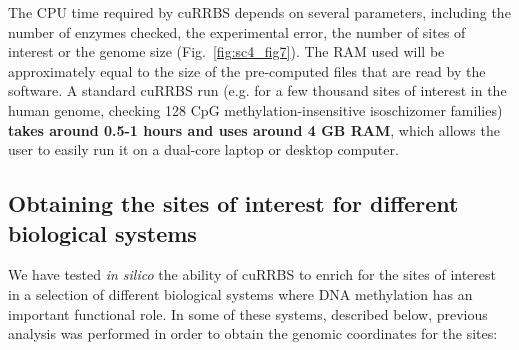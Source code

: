 \bigskip

The CPU time required by cuRRBS depends on several parameters, including the number of enzymes checked, the experimental error, the number of sites of interest or the genome size (Fig.~\ref{fig:sc4_fig7}). The RAM used will be approximately equal to the size of the pre-computed files that are read by the software. A standard cuRRBS run (e.g. for a few thousand sites of interest in the human genome, checking 128 CpG methylation-insensitive isoschizomer families) \textbf{takes around 0.5-1 hours and uses around 4 \acrshort{GB} \acrshort{RAM}}, which allows the user to easily run it on a dual-core laptop or desktop computer. 


\subsection*{Obtaining the sites of interest for different biological systems}

We have tested \textit{in silico} the ability of cuRRBS to enrich for the sites of interest in a selection of different biological systems where DNA methylation has an important functional role. In some of these systems, described below, previous analysis was performed in order to obtain the genomic coordinates for the sites:

